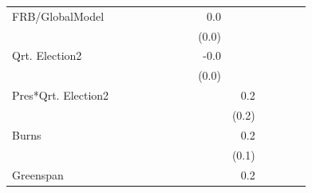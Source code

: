 \documentclass[a4paper]{article}\usepackage{graphicx, color}
\begin{document}
\begin{table}[ht]
\begin{center}
{\begin{tabular}{ l D{.}{.}{1}D{.}{.}{1}D{.}{.}{1}D{.}{.}{1}D{.}{.}{1}D{.}{.}{1}D{.}{.}{1}D{.}{.}{1}D{.}{.}{1}D{.}{.}{1}D{.}{.}{1}D{.}{.}{1}D{.}{.}{1} }
FRB/GlobalModel      &                 &                 &                 &                 &                 &                 &                 & 0.0             &                 &                 &                 &                 &                \\ 
                     &                 &                 &                 &                 &                 &                 &                 & (0.0)           &                 &                 &                 &                 &                \\ 
Qrt. Election2       &                 &                 &                 &                 &                 &                 &                 & -0.0            &                 &                 &                 &                 &                \\ 
                     &                 &                 &                 &                 &                 &                 &                 & (0.0)           &                 &                 &                 &                 &                \\ 
Pres*Qrt. Election2  &                 &                 &                 &                 &                 &                 &                 &                 & 0.2             &                 &                 &                 &                \\ 
                     &                 &                 &                 &                 &                 &                 &                 &                 & (0.2)           &                 &                 &                 &                \\ 
Burns                &                 &                 &                 &                 &                 &                 &                 &                 & 0.2             &                 &                 &                 &                \\ 
                     &                 &                 &                 &                 &                 &                 &                 &                 & (0.1)           &                 &                 &                 &                \\ 
Greenspan            &                 &                 &                 &                 &                 &                 &                 &                 & 0.2             &                 &                 &                 &                \\ 

\end{tabular}}
\end{center}
\end{table}
\end{document}

